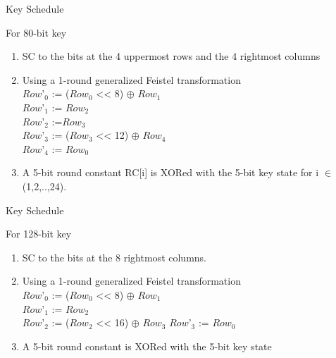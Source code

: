\begin{frame}{Key Schedule}
    \begin{block}{For 80-bit key}
    \begin{enumerate}
        \item SC to the bits at the 4 uppermost rows and the 4 rightmost
columns
\item Using a 1-round generalized Feistel transformation\\
$Row’_0$ := ($Row_0$ << 8) $\oplus$ $Row_1$\\
$Row’_1$ := $Row_2$\\
$Row’_2$ :=$Row_3$\\
$Row’_3$ := ($Row_3$ << 12) $\oplus$ $Row_4$\\
$Row’_4$ := $Row_0$
\item A 5-bit round constant RC[i] is XORed with the 5-bit key
state for i $\in$ (1,2,..,24).
    \end{enumerate}
        
    \end{block}
    
\end{frame}
\begin{frame}{Key Schedule}
    \begin{block}{For  128-bit key}
    \begin{enumerate}
    \item SC to the bits at the 8 rightmost columns.
    \item Using a 1-round generalized Feistel transformation\\
    $Row’_0$ := ($Row_0$ << 8) $\oplus$ $Row_1$\\
    $Row’_1$ := $Row_2$\\
    $Row’_2$ := ($Row_2$ << 16) $\oplus$ $Row_3$ 
    $Row’_3$ := $Row_0$
    \item A 5-bit round constant is XORed with the 5-bit key state
    \end{enumerate}
    \end{block}
\end{frame}
